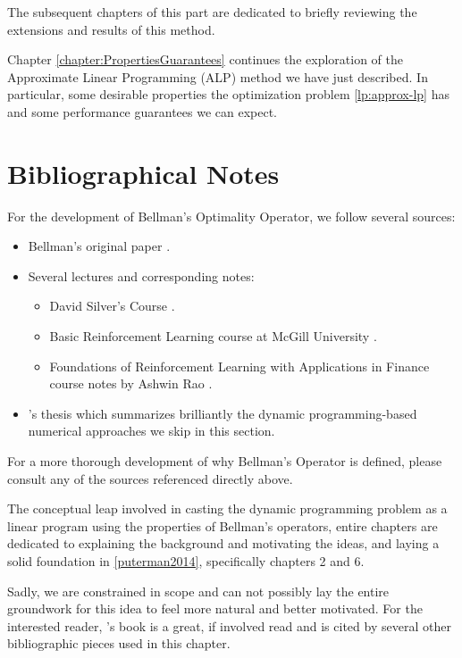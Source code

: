 The subsequent chapters of this part are dedicated to briefly reviewing the
extensions and results of this method.

Chapter \ref{chapter:PropertiesGuarantees} continues the exploration of the
Approximate Linear Programming (ALP) method we have just described. In
particular, some desirable properties the optimization problem
\eqref{lp:approx-lp} has and some performance guarantees we can expect.


\section{Bibliographical Notes}

For the development of Bellman's Optimality Operator, we follow several sources:
\begin{itemize}
    \item Bellman's original paper \cite{bellman1957}.
    \item Several lectures and corresponding notes:
    \begin{itemize}
        \item David Silver's Course \cite[Lects.~2-3]{silver2015}.
        \item Basic Reinforcement Learning course at McGill University
            \cite[Lect.~2]{moisescu-parejaa}.
        \item Foundations of Reinforcement Learning with Applications in Finance
            course notes by Ashwin Rao \cite[Lect. on Jan 15 2019]{rao2022}.
    \end{itemize}
    \item \citeauthor{nadeemward2021}'s thesis \cite{nadeemward2021} which
        summarizes brilliantly the dynamic programming-based numerical
        approaches we skip in this section.
\end{itemize}

For a more thorough development of why Bellman's Operator is defined, please
consult any of the sources referenced directly above.

The conceptual leap involved in casting the dynamic programming problem as a
linear program using the properties of Bellman's operators, entire chapters are
dedicated to explaining the background and motivating the ideas, and laying a
solid foundation in \ref{puterman2014}, specifically chapters 2 and 6.

Sadly, we are constrained in scope and can not possibly lay the entire
groundwork for this idea to feel more natural and better motivated. For the
interested reader, \citeauthor{puterman2014}'s book is a great, if involved
read and is cited by several other bibliographic pieces used in this chapter.